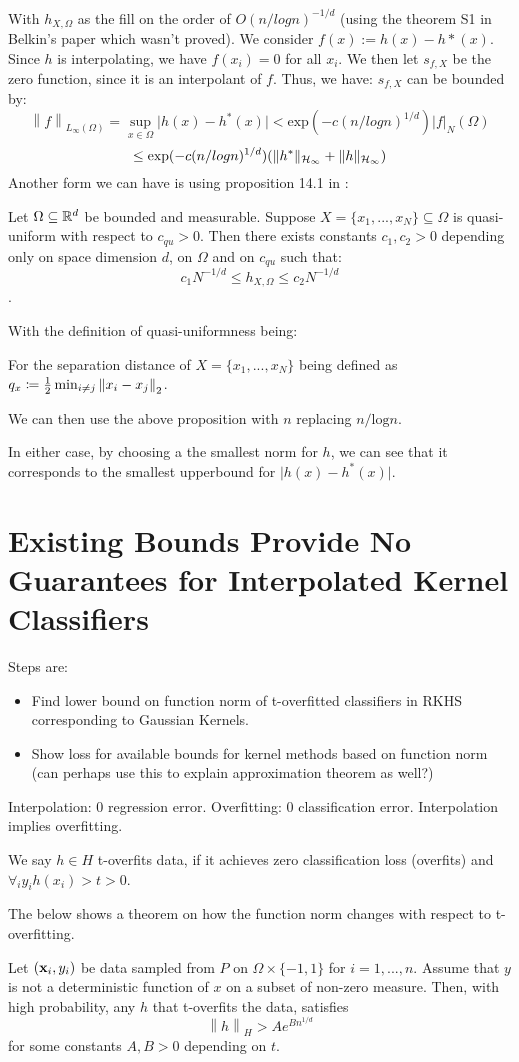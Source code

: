 \documentclass[english]{article}
\newcommand\norm[1]{\left\lVert#1\right\rVert}
\begin{document}
With $h_{X,\Omega}$ as the fill on the order of $O(n/logn)^{-1/d}$ (using the theorem S1 in Belkin's paper which wasn't proved).
We consider $f(x) := h(x) - h*(x)$. Since $h$ is interpolating, we have $f(x_i) = 0$ for all $x_i$. We then let $s_{f,X}$ be the zero function, since it is an interpolant of $f$. Thus, we have:
$s_{f,X}$ can be bounded by:
\[
\norm{f}_{L_\infty(\Omega)} = \sup_{x \in \Omega} \vert h(x) - h^*(x)\vert <
\text{exp}(-c(n/log n)^{1/d})|f|_N(\Omega)
\]
\[
\leq \text{exp}(-c(n/log n)^{1/d}) (\| h^* \|_{\mathcal{H}_\infty} + \| h \|_{\mathcal{H}_\infty})
\]
Another form we can have is using proposition 14.1 in \cite{ScatteredDataApproximation}:
\begin{prop}
	Let $\Omega \subseteq \mathbb{R}^d$ be bounded and measurable. Suppose $X = \{x_1, ... , x_N\} \subseteq \Omega$ is quasi-uniform with respect to  $c_{qu} > 0$. Then there exists constants $c_1, c_2 > 0$ depending only on space dimension $d$, on $\Omega$ and on $c_{qu}$ such that:
	\[c_1N^{-1/d} \leq h_{X,\Omega} \leq c_2N^{-1/d} \].
\end{prop}
With the definition of quasi-uniformness being:
\begin{defn}
	For the separation distance of $X = \{x_1, ... , x_N\}$ being defined as $q_x \coloneqq \half \min_{i\neq j} \norm{x_i - x_j}_2$.
\end{defn}
We can then use the above proposition with $n$ replacing $n/\text{log}n$.

In either case, by choosing a the smallest norm for $h$, we can see that it corresponds to the smallest upperbound for $\vert h(x) - h^*(x)\vert$.

\section{Existing Bounds Provide No Guarantees for Interpolated Kernel Classifiers} \label{sec:BoundsKernel}
Steps are: 
\begin{itemize}
	\item Find lower bound on function norm of t-overfitted classifiers in RKHS corresponding to Gaussian Kernels.
	\item Show loss for available bounds for kernel methods based on function norm (can perhaps use this to explain approximation theorem as well?)
\end{itemize}
Interpolation: 0 regression error. Overfitting: 0 classification error. Interpolation implies overfitting.
\begin{defn}
	We say $h \in H$ t-overfits data, if it achieves zero classification loss (overfits) and $\forall_iy_ih(x_i) > t > 0$.
\end{defn}
The below shows a theorem on how the function norm changes with respect to t-overfitting.
\begin{thm} \label{thm:normBound}
	Let $(\mathbf{x}_i ,y_i)$ be data sampled from $P$ on $\Omega \times \{-1, 1\}$ for $i = 1,..., n$. Assume that $y$ is not a deterministic function of $x$ on a subset of non-zero measure. Then, with high probability, any $h$ that t-overfits the data, satisfies
	\[\norm{h}_H > Ae^{Bn^{1/d}}\]
	for some constants $A, B > 0$ depending on $t$.
\end{thm}
\end{document}
